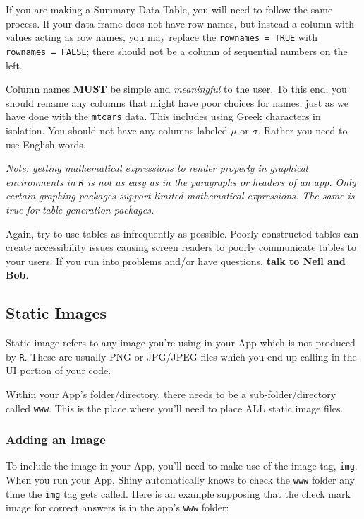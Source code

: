 \documentclass[
]{book}
\begin{document}
If you are making a Summary Data Table, you will need to follow the same process. If your data frame does not have row names, but instead a column with values acting as row names, you may replace the \texttt{rownames\ =\ TRUE} with \texttt{rownames\ =\ FALSE}; there should not be a column of sequential numbers on the left.

Column names \textbf{MUST} be simple and \emph{meaningful} to the user. To this end, you should rename any columns that might have poor choices for names, just as we have done with the \texttt{mtcars} data. This includes using Greek characters in isolation. You should not have any columns labeled \(\mu\) or \(\sigma\). Rather you need to use English words.

\emph{Note: getting mathematical expressions to render properly in graphical environments in \texttt{R} is not as easy as in the paragraphs or headers of an app. Only certain graphing packages support limited mathematical expressions. The same is true for table generation packages.}

Again, try to use tables as infrequently as possible. Poorly constructed tables can create accessibility issues causing screen readers to poorly communicate tables to your users. If you run into problems and/or have questions, \textbf{talk to Neil and Bob}.

\hypertarget{static-images}{%
\subsection{Static Images}\label{static-images}}

Static image refers to any image you're using in your App which is not produced by \texttt{R}. These are usually PNG or JPG/JPEG files which you end up calling in the UI portion of your code.

Within your App's folder/directory, there needs to be a sub-folder/directory called \texttt{www}. This is the place where you'll need to place ALL static image files.

\hypertarget{adding-an-image}{%
\subsubsection{Adding an Image}\label{adding-an-image}}

To include the image in your App, you'll need to make use of the image tag, \texttt{img}. When you run your App, Shiny automatically knows to check the \texttt{www} folder any time the \texttt{img} tag gets called. Here is an example supposing that the check mark image for correct answers is in the app's \texttt{www} folder:
\end{document}
